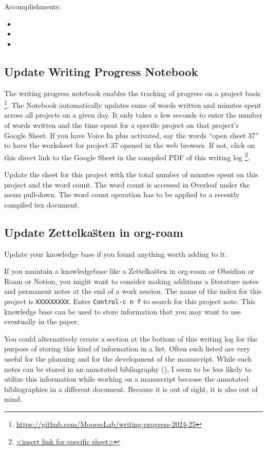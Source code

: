 \documentclass[10pt,letterpaper]{article}
\newcommand{\bi}{\begin{itemize}}
\newcommand{\ei}{\end{itemize}}
\begin{document}
Accomplishments:
\bi
\item 
\item
\item
\ei



\subsection{Update Writing Progress Notebook}
\label{sub:WPsheet}
The writing progress notebook enables the tracking of progress on a project basis \footnote{\url{https://github.com/MooersLab/writing-progress-2024-25}}.
The Notebook automatically updates sums of words written and minutes spent across all projects on a given day.
It only takes a few seconds to enter the number of words written and the time spent for a specific project on that project's Google Sheet. 
If you have Voice In plus activated, say the words ``open sheet 37'' to have the worksheet for project 37 opened in the web browser.
If not, click on this direct link to the Google Sheet in the compiled PDF of this writing log \footnote{\url{<insert link for specific sheet>}}.

Update the sheet for this project with the total number of minutes spent on this project and the word count.
The word count is accessed in Overleaf under the menu pull-down.
The word count operation has to be applied to a recently compiled tex document.






\subsection{Update Zettelka\"sten in org-roam}
\label{sub:zk}
Update your knowledge base if you found anything worth adding to it.

If you maintain a knowledgebase like a Zettelka\"sten in org-roam or Obsidian or Roam or Notion, you might want to consider making additions a literature notes and permanent notes at the end of a work session.
The name of the index for this project is \verb|XXXXXXXXX|.
Enter \texttt{Control-c n f} to search for this project note.
This knowledge base can be used to store information that you may want to use eventually in the paper.

You could alternatively create a section at the bottom of this writing log for the purpose of storing this kind of information in a list.
Often such listed are very useful for the planning and for the development of the manuscript.
While such notes can be stored in an annotated bibliography (), I seem to be less likely to utilize this information while working on a manuscript because the annotated bibliographies in a different document.
Because it is out of sight, it is also out of mind.
\end{document}
